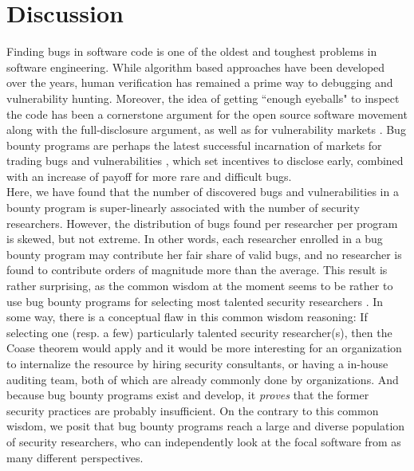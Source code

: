\section{Discussion}
\label{sec:discussion}
Finding bugs in software code is one of the oldest and toughest problems in software engineering. While algorithm based approaches have been developed over the years, human verification has remained a prime way to debugging and vulnerability hunting. Moreover, the idea of getting ``enough eyeballs" to inspect the code has been a cornerstone argument for the open source software movement \cite{raymond1999cathedral} along with the full-disclosure argument, as well as for vulnerability markets \cite{bohme2006comparison}. Bug bounty programs are perhaps the latest successful incarnation of markets for trading bugs and vulnerabilities \cite{bohme2006comparison}, which set incentives to disclose early, combined with an increase of payoff for more rare and difficult bugs.\\

Here, we have found that the number of discovered bugs and vulnerabilities in a bounty program is super-linearly associated with the number of security researchers. However, the distribution of bugs found per researcher per program is skewed, but not extreme. In other words, each researcher enrolled in a bug bounty program may contribute her fair share of valid bugs, and no researcher is found to contribute orders of magnitude more than the average. This result is rather surprising, as the common wisdom at the moment seems to be rather to use bug bounty programs for selecting most talented security researchers \cite{moussouris2016}. In some way, there is a conceptual flaw in this common wisdom reasoning: If selecting one (resp. a few) particularly talented security researcher(s), then the Coase theorem would apply \cite{coase1937} and it would be more interesting for an organization to internalize the resource by hiring security consultants, or having a in-house auditing team, both of which are already commonly done by organizations. And because bug bounty programs exist and develop, it {\it proves} that the former security practices are probably insufficient. On the contrary to this common wisdom, we posit that bug bounty programs reach a large and diverse population of security researchers, who can independently look at the focal software from as many different perspectives. \\

